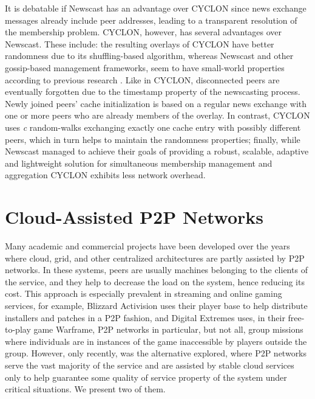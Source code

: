 \documentclass[runningheads]{llncs}
\begin{document}
It is debatable if Newscast has an advantage over CYCLON since news exchange messages already include peer addresses, leading to a transparent resolution of the membership problem. CYCLON, however, has several advantages over Newscast. These include: the resulting overlays of CYCLON have better randomness due to its shuffling-based algorithm, whereas Newscast and other gossip-based management frameworks, seem to have small-world properties according to previous research \cite{eval-gossip-based}. Like in CYCLON, disconnected peers are eventually forgotten due to the timestamp property of the newscasting process. Newly joined peers' cache initialization is based on a regular news exchange with one or more peers who are already members of the overlay. In contrast, CYCLON uses \textit{c} random-walks exchanging exactly one cache entry with possibly different peers, which in turn helps to maintain the randomness properties; finally, while Newscast managed to achieve their goals of providing a robust, scalable, adaptive and lightweight solution for simultaneous membership management and aggregation CYCLON exhibits less network overhead\cite{cyclon}.

\section{Cloud-Assisted P2P Networks}\label{sec:ca-networks}

Many academic and commercial projects have been developed over the years where cloud, grid, and other centralized architectures are partly assisted by P2P networks. In these systems, peers are usually machines belonging to the clients of the service, and they help to decrease the load on the system, hence reducing its cost. This approach is especially prevalent in streaming and online gaming services, for example, Blizzard Activision uses their player base to help distribute installers and patches in a P2P fashion, and Digital Extremes uses, in their free-to-play game Warframe, P2P networks in particular, but not all, group missions where individuals are in instances of the game inaccessible by players outside the group. However, only recently, was the alternative explored, where P2P networks serve the vast majority of the service and are assisted by stable cloud services only to help guarantee some quality of service property of the system under critical situations. We present two of them.
\end{document}
